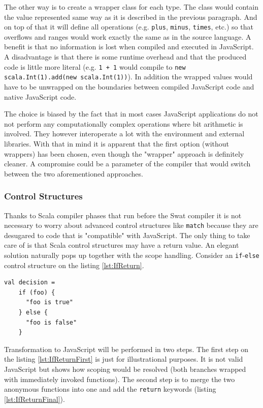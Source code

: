 \documentclass[12pt,a4paper]{report}
\begin{document}
The other way is to create a wrapper class for each type. The class would contain the value represented same way as it is described in the previous paragraph. And on top of that it will define all operations (e.g. \texttt{plus}, \texttt{minus}, \texttt{times}, etc.) so that overflows and ranges would work exactly the same as in the source language. A benefit is that no information is lost when compiled and executed in JavaScript. A disadvantage is that there is some runtime overhead and that the produced code is little more literal (e.g. \texttt{1 + 1} would compile to \texttt{new scala.Int(1).add(new scala.Int(1))}). In addition the wrapped values would have to be unwrapped on the boundaries between compiled JavaScript code and native JavaScript code. 

The choice is biased by the fact that in most cases JavaScript applications do not not perform any computationally complex operations where bit arithmetic is involved. They however interoperate a lot with the environment and external libraries. With that in mind it is apparent that the first option (without wrappers) has been chosen, even though the "wrapper" approach is definitely cleaner. A compromise could be a parameter of the compiler that would switch between the two aforementioned approaches.

\subsubsection*{Control Structures}

Thanks to Scala compiler phases that run before the Swat compiler it is not necessary to worry about advanced control structures like \texttt{match} because they are desugared to code that is "compatible" with JavaScript. The only thing to take care of is that Scala control structures may have a return value. An elegant solution naturally pops up together with the scope handling. Consider an \texttt{if}-\texttt{else} control structure on the listing \ref{lst:IfReturn}.

\begin{minipage}{\linewidth}
\begin{lstlisting}[caption={A condition with return value.},label={lst:IfReturn}]
val decision = 
	if (foo) {
	  "foo is true"
	} else {
	  "foo is false"
	}
\end{lstlisting}
\end{minipage}

Transformation to JavaScript will be performed in two steps. The first step on the listing \ref{lst:IfReturnFirst} is just for illustrational purposes. It is not valid JavaScript but shows how scoping would be resolved (both branches wrapped with immediately invoked functions). The second step is to merge the two anonymous functions into one and add the \texttt{return} keywords (listing \ref{lst:IfReturnFinal}).
\end{document}
